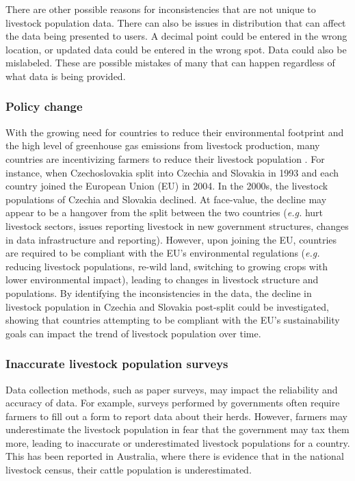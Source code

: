 \documentclass{article}
\begin{document}
There are other possible reasons for inconsistencies that are not unique to livestock population data. There can also be issues in distribution that can affect the data being presented to users. A decimal point could be entered in the wrong location, or updated data could be entered in the wrong spot. Data could also be mislabeled. These are possible mistakes of many that can happen regardless of what data is being provided.

\subsubsection{Policy change}
With the growing need for countries to reduce their environmental footprint and the high level of greenhouse gas emissions from livestock production, many countries are incentivizing farmers to reduce their livestock population \citep{lyman_incentivizing_2013}. For instance, when Czechoslovakia split into Czechia and Slovakia in 1993 and each country joined the European Union (EU) in 2004. In the 2000s, the livestock populations of Czechia and Slovakia declined. At face-value, the decline may appear to be a hangover from the split between the two countries (\textit{e.g.} hurt livestock sectors, issues reporting livestock in new government structures, changes in data infrastructure and reporting). However, upon joining the EU, countries are required to be compliant with the EU's environmental regulations (\textit{e.g.} reducing livestock populations, re-wild land, switching to growing crops with lower environmental impact), leading to changes in livestock structure and populations. By identifying the inconsistencies in the data, the decline in livestock population in Czechia and Slovakia post-split could be investigated, showing that countries attempting to be compliant with the EU's sustainability goals can impact the trend of livestock population over time. 

\subsubsection{Inaccurate livestock population surveys}

Data collection methods, such as paper surveys, may impact the reliability and accuracy of data. For example, surveys performed by governments often require farmers to fill out a form to report data about their herds. However, farmers may underestimate the livestock population in fear that the government may tax them more, leading to inaccurate or underestimated livestock populations for a country. This has been reported in Australia, where there is evidence that in the national livestock census, their cattle population is underestimated\citep{geoffry_fordyce_australian_nodate}.
\end{document}
